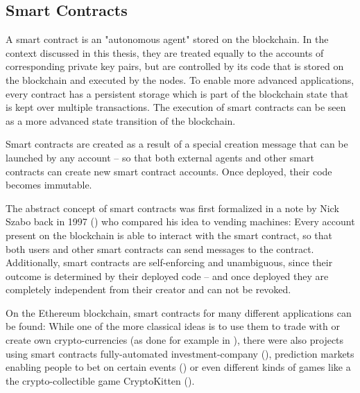 \subsection{Smart Contracts}
A smart contract is an "autonomous agent" stored on the blockchain. In the context discussed in this thesis, they are treated equally to the accounts of corresponding private key pairs, but are controlled by its code that is stored on the blockchain and executed by the nodes. To enable more advanced applications, every contract has a persistent storage which is part of the blockchain state that is kept over multiple transactions. The execution of smart contracts can be seen as a more advanced state transition of the blockchain.

Smart contracts are created as a result of a special creation message that can be launched by any account -- so that both external agents and other smart contracts can create new smart contract accounts. Once deployed, their code becomes immutable.

The abstract concept of smart contracts was first formalized in a note by Nick Szabo back in 1997 (\cite{szabo:smartcontracts}) who compared his idea to vending machines: Every account present on the blockchain is able to interact with the smart contract, so that both users and other smart contracts can send messages to the contract. Additionally, smart contracts are self-enforcing and unambiguous, since their outcome is determined by their deployed code -- and once deployed they are completely independent from their creator and can not be revoked.

On the Ethereum blockchain, smart contracts for many different applications can be found: While one of the more classical ideas is to use them to trade with or create own crypto-currencies (as done for example in \cite{etherscan:earlytokensale}), there were also projects using smart contracts fully-automated investment-company (\cite{etherscan:dao}), prediction markets enabling people to bet on certain events (\cite{augurproject:whitepaper}) or even different kinds of games like a the crypto-collectible game CryptoKitten (\cite{cryptokitten:whitepaper}).
